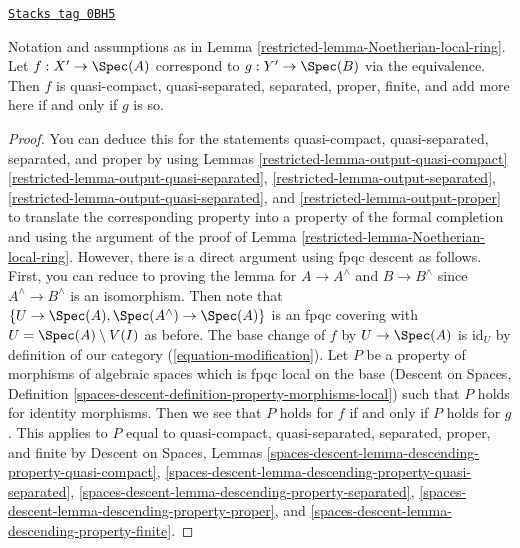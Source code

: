 \begin{lemma}
\label{restricted-lemma-Noetherian-local-ring-properties}
\href{https://stacks.math.columbia.edu/tag/0BH5}{\texttt{Stacks tag 0BH5}}

Notation and assumptions as in Lemma \ref{restricted-lemma-Noetherian-local-ring}.
Let $f : X' \to \Spec(A)$ correspond to $g : Y' \to \Spec(B)$
via the equivalence. Then $f$ is quasi-compact, quasi-separated, separated,
proper, finite, and add more here if and only if $g$ is so.
\end{lemma}

\begin{proof}

You can deduce this for the statements
quasi-compact, quasi-separated, separated, and proper
by using Lemmas \ref{restricted-lemma-output-quasi-compact}
\ref{restricted-lemma-output-quasi-separated},
\ref{restricted-lemma-output-separated},
\ref{restricted-lemma-output-quasi-separated}, and
\ref{restricted-lemma-output-proper}
to translate the corresponding property into a property
of the formal completion and using the argument of the proof
of Lemma \ref{restricted-lemma-Noetherian-local-ring}.
However, there is a direct argument using fpqc descent as follows.
First, you can reduce to proving the lemma for $A \to A^\wedge$
and $B \to B^\wedge$ since $A^\wedge  \to B^\wedge$ is an isomorphism.
Then note that $\{U \to \Spec(A), \Spec(A^\wedge) \to \Spec(A)\}$ is an
fpqc covering with $U = \Spec(A) \setminus V(I)$ as before.
The base change of $f$ by $U \to \Spec(A)$ is $\text{id}_U$
by definition of our category (\ref{equation-modification}).
Let $P$ be a property of morphisms of algebraic spaces which
is fpqc local on the base (Descent on Spaces, Definition
\ref{spaces-descent-definition-property-morphisms-local})
such that $P$ holds for identity morphisms.
Then we see that $P$ holds for $f$ if and only if $P$ holds for $g$.
This applies to $P$ equal to
quasi-compact, quasi-separated, separated, proper, and finite
by
Descent on Spaces, Lemmas
\ref{spaces-descent-lemma-descending-property-quasi-compact},
\ref{spaces-descent-lemma-descending-property-quasi-separated},
\ref{spaces-descent-lemma-descending-property-separated},
\ref{spaces-descent-lemma-descending-property-proper}, and
\ref{spaces-descent-lemma-descending-property-finite}.
\end{proof}

